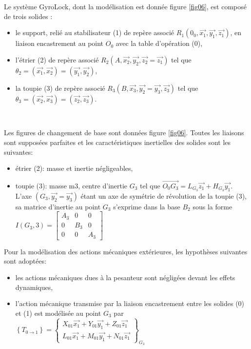 Le système GyroLock, dont la modélisation est donnée figure \ref{fig06}, est composé de trois solides :
\begin{itemize}
 \item le support, relié au stabilisateur (1) de repère associé $R_1(0_0,\overrightarrow{x_1},\overrightarrow{y_1},\overrightarrow{z_1})$, en liaison encastrement au point $O_0$ avec la table d'opération (0),
 \item l'étrier (2) de repère associé $R_2(A,\overrightarrow{x_2},\overrightarrow{y_2},\overrightarrow{z_2}=\overrightarrow{z_1})$ tel que $\theta_2=(\overrightarrow{x_1},\overrightarrow{x_2})=(\overrightarrow{y_1},\overrightarrow{y_2})$,
 \item la toupie (3) de repère associé $R_3(B,\overrightarrow{x_3},\overrightarrow{y_2}=\overrightarrow{y_3},\overrightarrow{z_3})$ tel que $\theta_3=(\overrightarrow{x_2},\overrightarrow{x_3})=(\overrightarrow{z_2},\overrightarrow{z_3})$.
\end{itemize}

~\

Les figures de changement de base sont données figure \ref{fig06}. Toutes les liaisons sont supposées parfaites et les caractéristiques inertielles des solides sont les suivantes:
\begin{itemize}
 \item étrier (2): masse et inertie négligeables,
 \item toupie (3): masse m3, centre d'inertie $G_3$ tel que $\overrightarrow{O_0G_3}=L_{G_3}\overrightarrow{z_1}+H_{G_3}\overrightarrow{y_1}$. L'axe $(G_3,\overrightarrow{y_2}=\overrightarrow{y_3})$ étant un axe de symétrie de révolution de la toupie (3), sa matrice d'inertie au point $G_3$ s'exprime dans la base $B_2$ sous la forme $I(G_3,3)=\left[\begin{array}{ccc} 
         A_3&0&0 \\ 0&B_3&0 \\ 0&0&A_3 
   \end{array}\right]$
\end{itemize}

\newpage

Pour la modélisation des actions mécaniques extérieures, les hypothèses suivantes sont adoptées:
\begin{itemize}
 \item les actions mécaniques dues à la pesanteur sont négligées devant les effets dynamiques,
 \item l'action mécanique transmise par la liaison encastrement entre les solides (0) et (1) est modélisée au point $G_3$ par
$\left \{T_{0 \rightarrow 1}\right \}=\left \{
\begin{matrix}
 X_{01}\overrightarrow{x_1}+Y_{01}\overrightarrow{y_1}+Z_{01}\overrightarrow{z_1} \\ 
 L_{01}\overrightarrow{x_1}+M_{01}\overrightarrow{y_1}+N_{01}\overrightarrow{z_1}
\end{matrix}
\right \}_{G_3}
$
\end{itemize}

